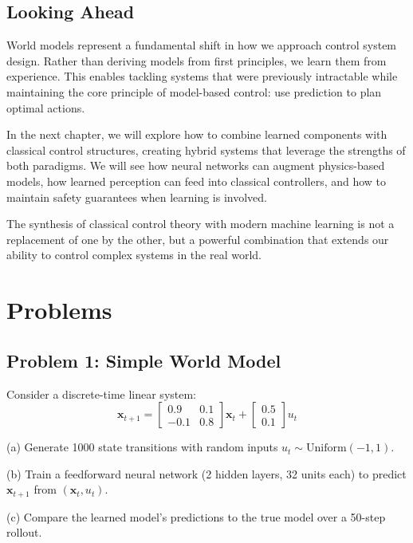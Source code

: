 \subsection{Looking Ahead}

World models represent a fundamental shift in how we approach control system design. Rather than deriving models from first principles, we learn them from experience. This enables tackling systems that were previously intractable while maintaining the core principle of model-based control: use prediction to plan optimal actions.

In the next chapter, we will explore how to combine learned components with classical control structures, creating hybrid systems that leverage the strengths of both paradigms. We will see how neural networks can augment physics-based models, how learned perception can feed into classical controllers, and how to maintain safety guarantees when learning is involved.

The synthesis of classical control theory with modern machine learning is not a replacement of one by the other, but a powerful combination that extends our ability to control complex systems in the real world.

\section{Problems}

\subsection{Problem 1: Simple World Model}

Consider a discrete-time linear system:
\begin{equation}
\mathbf{x}_{t+1} = \begin{bmatrix} 0.9 & 0.1 \\ -0.1 & 0.8 \end{bmatrix} \mathbf{x}_t + \begin{bmatrix} 0.5 \\ 0.1 \end{bmatrix} u_t
\end{equation}

(a) Generate 1000 state transitions with random inputs $u_t \sim \text{Uniform}(-1, 1)$.

(b) Train a feedforward neural network (2 hidden layers, 32 units each) to predict $\mathbf{x}_{t+1}$ from $(\mathbf{x}_t, u_t)$.

(c) Compare the learned model's predictions to the true model over a 50-step rollout.

